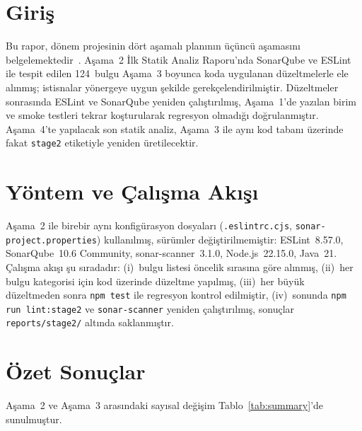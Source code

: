 \documentclass[conference]{IEEEtran}
\begin{document}
\section{Giriş}

Bu rapor, dönem projesinin dört aşamalı planının üçüncü aşamasını
belgelemektedir~\cite{b1,b2}. Aşama~2 İlk Statik Analiz Raporu'nda
SonarQube ve ESLint ile tespit edilen 124~bulgu Aşama~3 boyunca koda
uygulanan düzeltmelerle ele alınmış; istisnalar yönergeye uygun şekilde
gerekçelendirilmiştir. Düzeltmeler sonrasında ESLint ve SonarQube
yeniden çalıştırılmış, Aşama~1'de yazılan birim ve smoke testleri
tekrar koşturularak regresyon olmadığı doğrulanmıştır. Aşama~4'te
yapılacak son statik analiz, Aşama~3 ile aynı kod tabanı üzerinde fakat
\texttt{stage2} etiketiyle yeniden üretilecektir.

\section{Yöntem ve Çalışma Akışı}

Aşama~2 ile birebir aynı konfigürasyon dosyaları
(\texttt{.eslintrc.cjs}, \texttt{sonar-project.properties}) kullanılmış,
sürümler değiştirilmemiştir: ESLint~8.57.0, SonarQube~10.6 Community,
sonar-scanner~3.1.0, Node.js~22.15.0, Java~21. Çalışma akışı şu
sıradadır: (i)~bulgu listesi öncelik sırasına göre alınmış, (ii)~her
bulgu kategorisi için kod üzerinde düzeltme yapılmış, (iii)~her büyük
düzeltmeden sonra \texttt{npm test} ile regresyon kontrol edilmiştir,
(iv)~sonunda \texttt{npm run lint:stage2} ve
\texttt{sonar-scanner} yeniden çalıştırılmış, sonuçlar
\texttt{reports/stage2/} altında saklanmıştır.

\section{Özet Sonuçlar}
\label{sec:ozet}

Aşama~2 ve Aşama~3 arasındaki sayısal değişim Tablo~\ref{tab:summary}'de
sunulmuştur.
\end{document}
